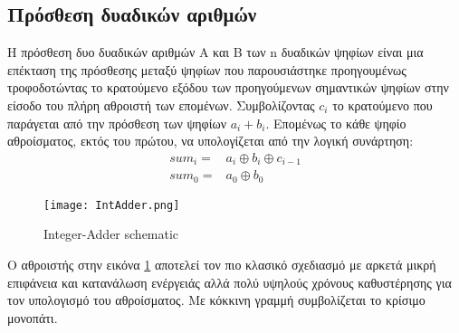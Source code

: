 % 
\subsection{Πρόσθεση δυαδικών αριθμών}

Η πρόσθεση δυο δυαδικών αριθμών A και Β των n δυαδικών ψηφίων είναι 
μια επέκταση της πρόσθεσης μεταξύ ψηφίων που παρουσιάστηκε προηγουμένως τροφοδοτώντας 
το κρατούμενο εξόδου των προηγούμενων σημαντικών ψηφίων στην είσοδο του πλήρη αθροιστή 
των επομένων. Συμβολίζοντας $c_{i}$ το κρατούμενο που παράγεται από την πρόσθεση των ψηφίων 
$a_i+b_i$. Επομένως το κάθε ψηφίο αθροίσματος, εκτός του πρώτου, να υπολογίζεται από την 
λογική συνάρτηση:
\begin{equation}
\begin{split}
    sum_i =& a_i \oplus b_i \oplus c_{i-1}\\
    sum_0 =& a_0 \oplus b_0    
\end{split}
\end{equation}

\begin{figure}[H]
\centering
\texttt{[image: IntAdder.png]}
\caption{Integer-Adder schematic}
\label{IntegerAdderSchematic}
\end{figure}
Ο αθροιστής στην εικόνα \ref{IntegerAdderSchematic} αποτελεί τον πιο κλασικό σχεδιασμό 
με αρκετά μικρή επιφάνεια και κατανάλωση ενέργειάς αλλά πολύ υψηλούς χρόνους καθυστέρησης 
για τον υπολογισμό του αθροίσματος.
Με κόκκινη γραμμή συμβολίζεται το κρίσιμο μονοπάτι. 



